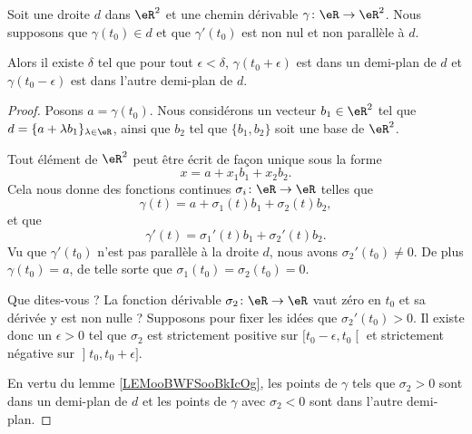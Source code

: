 \begin{proposition}     \label{PROPooTPHKooXnpJaV}
	Soit une droite \( d\) dans \( \eR^2\) et une chemin dérivable \( \gamma\colon \eR\to \eR^2\). Nous supposons que \( \gamma(t_0)\in d\) et que \( \gamma'(t_0)\) est non nul et non parallèle à \( d\).

	Alors il existe \( \delta\) tel que pour tout \( \epsilon<\delta\), \( \gamma(t_0+\epsilon)\) est dans un demi-plan de \( d\) et \( \gamma(t_0-\epsilon)\) est dans l'autre demi-plan de \( d\).
\end{proposition}

\begin{proof}
	Posons \( a=\gamma(t_0)\). Nous considérons un vecteur \( b_1\in \eR^2\) tel que \( d=\{ a+\lambda b_1 \}_{\lambda\in \eR}\), ainsi que \( b_2\) tel que \( \{ b_1,b_2 \}\) soit une base de \( \eR^2\).

	Tout élément de \( \eR^2\) peut être écrit de façon unique sous la forme
	\begin{equation}
		x=a+x_1b_1+x_2b_2.
	\end{equation}
	Cela nous donne des fonctions continues \( \sigma_i\colon \eR\to \eR\) telles que
	\begin{equation}
		\gamma(t)=a+\sigma_1(t)b_1+\sigma_2(t)b_2,
	\end{equation}
	et que
	\begin{equation}
		\gamma'(t)=\sigma_1'(t)b_1+\sigma_2'(t)b_2.
	\end{equation}
	Vu que \( \gamma'(t_0)\) n'est pas parallèle à la droite \( d\), nous avons \( \sigma_2'(t_0)\neq 0\). De plus \( \gamma(t_0)=a\), de telle sorte que \( \sigma_1(t_0)=\sigma_2(t_0)=0\).

	Que dites-vous ? La fonction dérivable \( \sigma_2\colon \eR\to \eR\) vaut zéro en \( t_0\) et sa dérivée y est non nulle ? Supposons pour fixer les idées que \( \sigma_2'(t_0)>0\). Il existe donc un \( \epsilon>0\) tel que \( \sigma_2\) est strictement positive sur \( \mathopen[ t_0-\epsilon , t_0 \mathclose[\) et strictement négative sur \( \mathopen] t_0 , t_0+\epsilon \mathclose]\).

	En vertu du lemme \ref{LEMooBWFSooBkIcOg}, les points de \( \gamma\) tels que \( \sigma_2>0\) sont dans un demi-plan de \( d\) et les points de \( \gamma\) avec \( \sigma_2<0\) sont dans l'autre demi-plan.
\end{proof}


